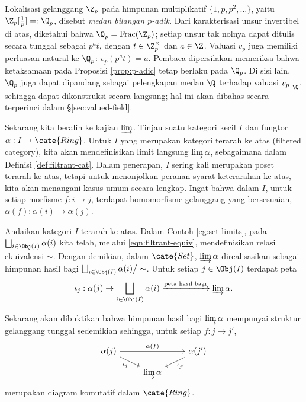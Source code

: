 Lokalisasi gelanggang $\Z_p$ pada himpunan multiplikatif $\{1,p,p^2,\ldots\}$, yaitu $\Z_p[\frac{1}{p}] =: \Q_p$, disebut \emph{medan bilangan $p$-adik}. Dari karakterisasi unsur invertibel di atas, diketahui bahwa $\Q_p = \text{Frac}(\Z_p)$; setiap unsur tak nolnya dapat ditulis secara tunggal sebagai $p^a t$, dengan $t \in \Z_p^\times$ dan $a \in \Z$. Valuasi $v_p$ juga memiliki perluasan natural ke $\Q_p$: $v_p(p^a t) = a$. Pembaca dipersilakan memeriksa bahwa ketaksamaan pada Proposisi \ref{prop:p-adic} tetap berlaku pada $\Q_p$. Di sisi lain, $\Q_p$ juga dapat dipandang sebagai pelengkapan medan $\Q$ terhadap valuasi $v_p\big|_\Q$, sehingga dapat dikonstruksi secara langsung; hal ini akan dibahas secara terperinci dalam \S\ref{sec:valued-field}.

Sekarang kita beralih ke kajian $\varinjlim$. Tinjau suatu kategori kecil $I$ dan fungtor $\alpha: I \to \cate{Ring}$. Untuk $I$ yang merupakan kategori terarah ke atas (filtered category), kita akan mendefinisikan limit langsung $\varinjlim \alpha$, sebagaimana dalam Definisi \ref{def:filtrant-cat}. Dalam penerapan, $I$ sering kali merupakan poset terarah ke atas, tetapi untuk menonjolkan peranan syarat keterarahan ke atas, kita akan menangani kasus umum secara lengkap. Ingat bahwa dalam $I$, untuk setiap morfisme $f: i \to j$, terdapat homomorfisme gelanggang yang bersesuaian, $\alpha(f): \alpha(i) \to \alpha(j)$.

Andaikan kategori $I$ terarah ke atas. Dalam Contoh \ref{eg:set-limits}, pada $\bigsqcup_{i \in \Obj(I)} \alpha(i)$ kita telah, melalui \eqref{eqn:filtrant-equiv}, mendefinisikan relasi ekuivalensi $\sim$. Dengan demikian, dalam $\cate{Set}$, $\varinjlim \alpha$ direalisasikan sebagai himpunan hasil bagi $\bigsqcup_{i \in \Obj(I)} \alpha(i) \big/ \sim$. Untuk setiap $j \in \Obj(I)$ terdapat peta
\[ \iota_j: \alpha(j) \to \bigsqcup_{i \in \Obj(I)} \alpha(i) \xrightarrow{\text{peta hasil bagi}} \varinjlim \alpha. \]

Sekarang akan dibuktikan bahwa himpunan hasil bagi $\varinjlim \alpha$ mempunyai struktur gelanggang tunggal sedemikian sehingga, untuk setiap $f: j \to j'$,
\begin{equation}\label{eqn:filtrant-lim-ring} \begin{tikzcd}[row sep=small]
	\alpha(j) \arrow[rd, "\iota_j"'] \arrow[rr, "\alpha(f)"] & & \alpha(j') \arrow[ld, "{\iota_{j'}}"] \\
	& \varinjlim \alpha &
\end{tikzcd}\end{equation}
merupakan diagram komutatif dalam $\cate{Ring}$.

